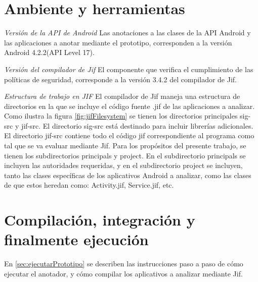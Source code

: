 \section{Ambiente y herramientas}
\textit{Versión de la API de Android}\newline
Las anotaciones a las clases de la API Android y las aplicaciones a anotar
mediante el prototipo, corresponden a la versión Android 4.2.2(API Level 17).

\textit{Versión del compilador de Jif}\newline
El componente que verifica el cumplimiento de las políticas de seguridad,
corresponde a la versión 3.4.2 del compilador de Jif.

\textit{Estructura de trabajo en JIF}\newline
El compilador de Jif maneja una estructura de directorios en la que se incluye
el código fuente .jif de las aplicaciones a analizar. Como ilustra la figura
\ref{fig:jifFilesystem} se tienen los directorios principales sig-src y jif-src.
El directorio sig-src está destinado para incluir librerías adicionales.\newline 
El directorio jif-src contiene todo el código jif correspondiente al programa
como tal que se va evaluar mediante Jif. Para los propósitos del presente
trabajo, se tienen los subdirectorios principals y project. En el subdirectorio
principals se incluyen las autoridades requeridas, y en el subdirectorio
project se incluyen, tanto las clases específicas de los aplicativos Android a
analizar, como las clases de que estos heredan como: Activity.jif, Service.jif,
etc.

\section{Compilación, integración y finalmente ejecución }
En \ref{sec:ejecutarPrototipo} se describen las instrucciones paso a paso de cómo
ejecutar el anotador, y cómo compilar los aplicativos a analizar mediante Jif.
